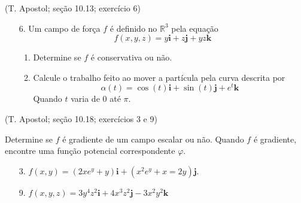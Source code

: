 \documentclass[../main.tex]{subfiles}
\begin{document}
	\begin{exercicio}{3}
		(T. Apostol; seção 10.13; exercício 6)
		\begin{enumerate}
			\item[6.] Um campo de força $f$ é definido no $\mathbb{R}^3$ pela equação
			\[
			f(x,y,z)=y\textbf{i} + z\textbf{j} +yz\textbf{k}
			\]
			\begin{enumerate}[label=\alph*)]
				\item Determine se $f$ é conservativa ou não.
				\item Calcule o trabalho feito ao mover a partícula pela curva descrita por
				\[
				\alpha(t)=\cos(t)\textbf{i}+\sin(t)\textbf{j}+e^t\textbf{k}
				\]
				Quando $t$ varia de $0$ até $\pi$.
			\end{enumerate}
		\end{enumerate}
	\end{exercicio}
	
	\begin{exercicio}{4}
		(T. Apostol; seção 10.18; exercícios 3 e 9)
		
		Determine se $f$ é gradiente de um campo escalar ou não. Quando $f$ é gradiente, encontre uma função potencial correspondente $\varphi$.
		\begin{enumerate} 
			\item[3.] $f(x,y)=(2xe^y+y)\textbf{i}+(x^2e^y+x=2y)\textbf{j}$.
			\item[9.] $f(x,y,z)=3y^4z^2\textbf{i}+4x^3z^2\textbf{j}-3x^2y^2\textbf{k}$
		\end{enumerate}
	\end{exercicio}
\end{document}
